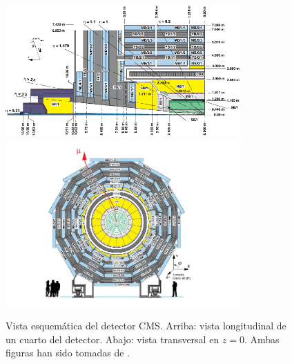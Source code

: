 \begin{figure}
\centering
\includegraphics[width=0.8\textwidth]{figures/CMSview1.png}
\includegraphics[width=0.8\textwidth]{figures/CMSview.png}
\caption{Vista esquem\'atica del detector CMS. Arriba: vista longitudinal de un cuarto del detector. Abajo: vista transversal en $z = 0$. Ambas figuras han sido tomadas de \cite{DTperformance}.}
\label{fig:CMSsub}
\end{figure}
